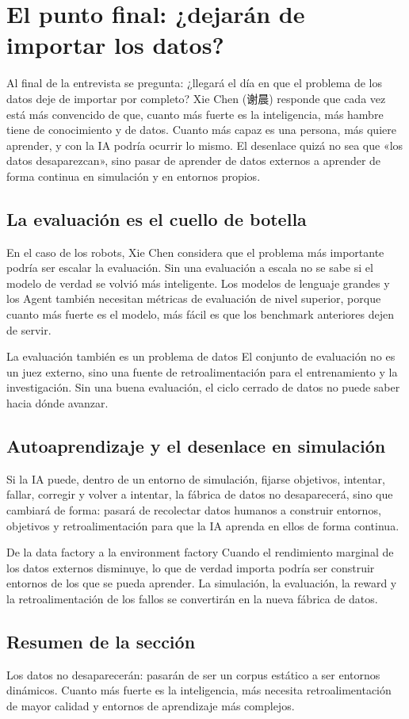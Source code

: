 \section{El punto final: ¿dejarán de importar los datos?}

Al final de la entrevista se pregunta: ¿llegará el día en que el problema de los datos deje de importar por completo? Xie Chen (谢晨) responde que cada vez está más convencido de que, cuanto más fuerte es la inteligencia, más hambre tiene de conocimiento y de datos. Cuanto más capaz es una persona, más quiere aprender, y con la IA podría ocurrir lo mismo. El desenlace quizá no sea que «los datos desaparezcan», sino pasar de aprender de datos externos a aprender de forma continua en simulación y en entornos propios.

\subsection{La evaluación es el cuello de botella}

En el caso de los robots, Xie Chen considera que el problema más importante podría ser escalar la evaluación. Sin una evaluación a escala no se sabe si el modelo de verdad se volvió más inteligente. Los modelos de lenguaje grandes y los Agent también necesitan métricas de evaluación de nivel superior, porque cuanto más fuerte es el modelo, más fácil es que los benchmark anteriores dejen de servir.

\begin{importantbox}{La evaluación también es un problema de datos}
El conjunto de evaluación no es un juez externo, sino una fuente de retroalimentación para el entrenamiento y la investigación. Sin una buena evaluación, el ciclo cerrado de datos no puede saber hacia dónde avanzar.
\end{importantbox}

\subsection{Autoaprendizaje y el desenlace en simulación}

Si la IA puede, dentro de un entorno de simulación, fijarse objetivos, intentar, fallar, corregir y volver a intentar, la fábrica de datos no desaparecerá, sino que cambiará de forma: pasará de recolectar datos humanos a construir entornos, objetivos y retroalimentación para que la IA aprenda en ellos de forma continua.

\begin{knowledgebox}{De la data factory a la environment factory}
Cuando el rendimiento marginal de los datos externos disminuye, lo que de verdad importa podría ser construir entornos de los que se pueda aprender. La simulación, la evaluación, la reward y la retroalimentación de los fallos se convertirán en la nueva fábrica de datos.
\end{knowledgebox}

\subsection{Resumen de la sección}

Los datos no desaparecerán: pasarán de ser un corpus estático a ser entornos dinámicos. Cuanto más fuerte es la inteligencia, más necesita retroalimentación de mayor calidad y entornos de aprendizaje más complejos.
